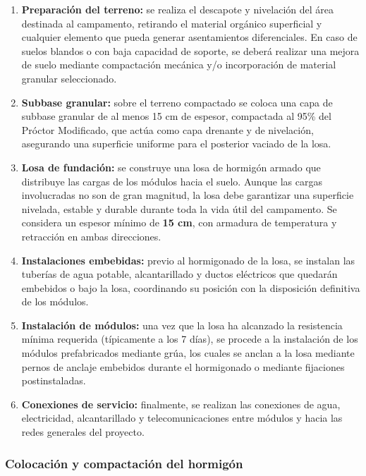 \begin{enumerate}
    \item \textbf{Preparación del terreno:} se realiza el descapote y nivelación del área destinada al campamento, retirando el material orgánico superficial y cualquier elemento que pueda generar asentamientos diferenciales. En caso de suelos blandos o con baja capacidad de soporte, se deberá realizar una mejora de suelo mediante compactación mecánica y/o incorporación de material granular seleccionado.

    \item \textbf{Subbase granular:} sobre el terreno compactado se coloca una capa de subbase granular de al menos 15 cm de espesor, compactada al 95\% del Próctor Modificado, que actúa como capa drenante y de nivelación, asegurando una superficie uniforme para el posterior vaciado de la losa.

    \item \textbf{Losa de fundación:} se construye una losa de hormigón armado que distribuye las cargas de los módulos hacia el suelo. Aunque las cargas involucradas no son de gran magnitud, la losa debe garantizar una superficie nivelada, estable y durable durante toda la vida útil del campamento. Se considera un espesor mínimo de \textbf{15 cm}, con armadura de temperatura y retracción en ambas direcciones.

    \item \textbf{Instalaciones embebidas:} previo al hormigonado de la losa, se instalan las tuberías de agua potable, alcantarillado y ductos eléctricos que quedarán embebidos o bajo la losa, coordinando su posición con la disposición definitiva de los módulos.

    \item \textbf{Instalación de módulos:} una vez que la losa ha alcanzado la resistencia mínima requerida (típicamente a los 7 días), se procede a la instalación de los módulos prefabricados mediante grúa, los cuales se anclan a la losa mediante pernos de anclaje embebidos durante el hormigonado o mediante fijaciones postinstaladas.

    \item \textbf{Conexiones de servicio:} finalmente, se realizan las conexiones de agua, electricidad, alcantarillado y telecomunicaciones entre módulos y hacia las redes generales del proyecto.
\end{enumerate}

\subsubsection{Colocación y compactación del hormigón}


